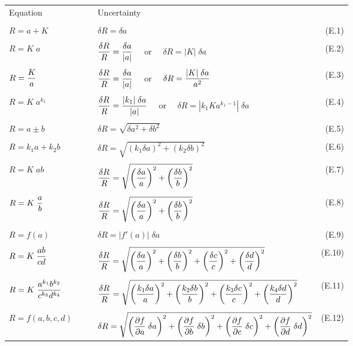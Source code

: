 \begin{center}
\begin{tabular}{lclr}      
{\Large Equation}&$\quad$&{\Large Uncertainty}\\ \\
${\displaystyle R= a+K }$&&
${\displaystyle \delta R= \delta a
}$&(E.1)\\ \\
${\displaystyle R= K\; a }$&&
${\displaystyle {\delta R \over R}={\delta a \over |a|}
}\quad$ or $\quad{\displaystyle {\delta R }={|K|\; \delta a }
}$&(E.2)\\ \\
${\displaystyle R= {K\over a} }$&&
${\displaystyle {\delta R \over R}={\delta a \over |a|}
}\quad$ or $\quad{\displaystyle {\delta R }={|K|\; \delta a \over a^2}
}$&(E.3)\\ \\
${\displaystyle R= K\; a^{k_1} }$&&
${\displaystyle {\delta R \over R}={|k_1|\;\delta a \over |a|}
}\quad$ or $\quad{\displaystyle {\delta R }={|k_1K a^{k_1-1}|\; \delta a }
}$&(E.4)\\ \\
${\displaystyle R= a\pm b }$&&
${\displaystyle \delta R= \sqrt{\delta a^2 + \delta b^2} 
}$&(E.5)\\ \\
${\displaystyle R= k_1 a + k_2 b }$&&
${\displaystyle \delta R=\sqrt{
\left({k_1 \delta a}\right)^2+
\left({k_2 \delta b}\right)^2}
}$&(E.6)\\ \\
${\displaystyle R= K\;ab }$&&
${\displaystyle {\delta R \over R}=\sqrt{
\left({\delta a\over a}\right)^2+
\left({\delta b\over b}\right)^2}
}$&(E.7)\\ \\
${\displaystyle R= K\;{a\over b} }$&&
${\displaystyle {\delta R \over R}=\sqrt{
\left({\delta a\over a}\right)^2+
\left({\delta b\over b}\right)^2}
}$&(E.8)\\ \\
${\displaystyle R= f(a) }$&&
${\displaystyle \delta R= |f'(a)|\;\delta a
}$&(E.9)\\ \\
${\displaystyle R=K\;{ab \over cd} }$&&
${\displaystyle {\delta R \over R}=\sqrt{
\left({\delta a\over a}\right)^2+
\left({\delta b\over b}\right)^2+
\left({\delta c\over c}\right)^2+
\left({\delta d\over d}\right)^2} }$&(E.10)\\ \\
${\displaystyle R=K\;{a^{k_1}b^{k_2} \over c^{k_3}d^{k_4}} }$&&
${\displaystyle {\delta R \over R}=\sqrt{
\left({k_1 \delta a\over a}\right)^2+
\left({k_2 \delta b\over b}\right)^2+
\left({k_3 \delta c\over c}\right)^2+
\left({k_4 \delta d\over d}\right)^2} }$&(E.11)\\ \\
${\displaystyle R=f(a,b,c,d) }$&&
${\displaystyle \delta R=\sqrt{
\left({\partial f \over \partial a}\;\delta a\right)^2+
\left({\partial f \over \partial b}\;\delta b\right)^2+
\left({\partial f \over \partial c}\;\delta c\right)^2+
\left({\partial f \over \partial d}\;\delta d\right)^2} }$&(E.12)\\
\end{tabular}
\end{center}
